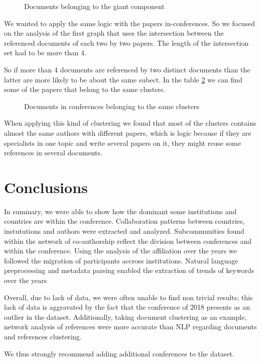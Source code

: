 \documentclass[article,twocolumn]{IEEEtran}
\begin{document}
    \begin{figure}
        \begin{center}\end{center}
        \caption{Documents belonging to the giant component}
        \label{fig10}
    \end{figure}
    
    We wanted to apply the same logic with the papers in-conferences. So we
focused on the analysis of the first graph that uses the intersection
between the referenced documents of each two by two papers. The length
of the intersection set had to be more than 4.

So if more than 4 documents are referenced by two distinct documents
than the latter are more likely to be about the same subect. In the
table \ref{fig11} we can find some of the papers that belong to the same
clusters.


    \begin{figure}
        \begin{center}\end{center}
        \caption{Documents in conferences belonging to the same clusters}
        \label{fig11}
    \end{figure}
    
    When applying this kind of clustering we found that most of the clusters
contains almost the same authors with different papers, which is logic
because if they are specialists in one topic and write several papers on
it, they might reuse some references in several documents.

    \hypertarget{conclusions}{%
\section{Conclusions}\label{conclusions}}

In summary, we were able to show how the dominant some institutions and
countries are within the conference. Collaboration patterns between
countries, instututions and authors were extracted and analyzed.
Subcommunities found within the network of co-authorship reflect the
division between conferences and within the conference. Using the
analysis of the affiliation over the years we followed the migration of
participants accross institutions. Natural language preprocessing and
metadata parsing enabled the extraction of trends of keywords over the
years

Overall, due to lack of data, we were often unable to find non trivial
results; this lack of data is aggravated by the fact that the conference
of 2018 presents as an outlier in the dataset. Additionally, taking
document clustering as an example, network analysis of references were
more accurate than NLP regarding documents and references clustering.

We thus strongly recommend adding additional conferences to the dataset.
\newpage

    
    



    
    
\end{document}
